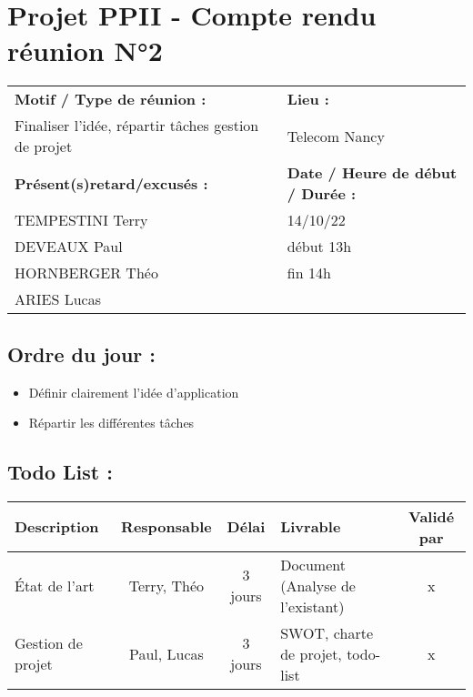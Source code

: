 \documentclass{article}
\begin{document}
\section*{Projet PPII - Compte rendu réunion N°2}
\begin{tabular}{|p{7cm}|p{6cm}|}
    \hline
    \textbf{Motif / Type de réunion :}
    & \textbf{Lieu :}
    \\
    Finaliser l’idée, répartir tâches gestion de projet 
    & 
    Telecom Nancy
    \\ \hline
    \textbf{Présent(s)retard/excusés :}
    &
    \textbf{Date / Heure de début / Durée :}
    \\ 
    TEMPESTINI Terry &  14/10/22\\  
    DEVEAUX Paul & début 13h\\
    HORNBERGER Théo & fin 14h\\
    ARIES Lucas & 
    \\ \hline
\end{tabular}

\subsection*{Ordre du jour :}
\begin{itemize}
    \item{Définir clairement l’idée d’application}
    \item{Répartir les différentes tâches}
\end{itemize}

\subsection*{Todo List :}
\begin{tabular}{|p{3.5cm}|c|c|p{4.5cm}|c|}
    \hline 
    Description & Responsable & Délai & Livrable & Validé par 
    \\ \hline
    État de l’art & Terry, Théo & 3 jours &Document (Analyse de l’existant) & x
    \\ \hline
    Gestion de projet & Paul, Lucas & 3 jours & SWOT, charte de projet, todo-list & x
    \\ \hline
\end{tabular}
\end{document}
